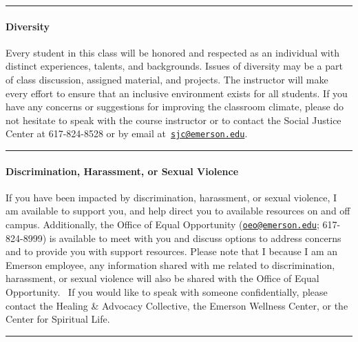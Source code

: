 \documentclass[
  letterpaper,
  DIV=11,
  numbers=noendperiod]{scrartcl}
\let\oldparagraph\paragraph
\renewcommand{\paragraph}[1]{\oldparagraph{#1}\mbox{}}
\begin{document}
\begin{center}\rule{0.5\linewidth}{0.5pt}\end{center}

\hypertarget{diversity}{%
\paragraph{Diversity}\label{diversity}}

Every student in this class will be honored and respected as an
individual with distinct experiences, talents, and backgrounds. Issues
of diversity may be a part of class discussion, assigned material, and
projects. The instructor will make every effort to ensure that an
inclusive environment exists for all students. If you have any concerns
or suggestions for improving the classroom climate, please do not
hesitate to speak with the course instructor or to contact the Social
Justice Center at 617-824-8528 or by email
at~\href{mailto:sjc@emerson.edu}{\nolinkurl{sjc@emerson.edu}}.

\begin{center}\rule{0.5\linewidth}{0.5pt}\end{center}

\hypertarget{discrimination-harassment-or-sexual-violence}{%
\paragraph{Discrimination, Harassment, or Sexual
Violence}\label{discrimination-harassment-or-sexual-violence}}

If you have been impacted by discrimination, harassment, or sexual
violence, I am available to support you, and help direct you to
available resources on and off campus. Additionally, the Office of Equal
Opportunity (\href{mailto:oeo@emerson.edu}{\nolinkurl{oeo@emerson.edu}};
617-824-8999) is available to meet with you and discuss options to
address concerns and to provide you with support resources. Please note
that I because I am an Emerson employee, any information shared with me
related to discrimination, harassment, or sexual violence will also be
shared with the Office of Equal Opportunity. ~If you would like to speak
with someone confidentially, please contact the Healing \& Advocacy
Collective, the Emerson Wellness Center, or the Center for Spiritual
Life.

\begin{center}\rule{0.5\linewidth}{0.5pt}\end{center}
\end{document}
